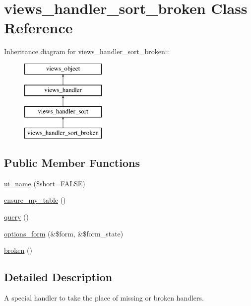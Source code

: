 \hypertarget{classviews__handler__sort__broken}{
\section{views\_\-handler\_\-sort\_\-broken Class Reference}
\label{classviews__handler__sort__broken}
}
Inheritance diagram for views\_\-handler\_\-sort\_\-broken::\begin{figure}[H]
\begin{center}
\leavevmode
\includegraphics[height=4cm]{classviews__handler__sort__broken}
\end{center}
\end{figure}
\subsection*{Public Member Functions}
\begin{CompactItemize}
\item 
\hyperlink{classviews__handler__sort__broken_d83cfcffa971a65b6e306d6fac7f6c10}{ui\_\-name} (\$short=FALSE)
\item 
\hyperlink{classviews__handler__sort__broken_148e3b71f7327ed44a139ecefbd1d43b}{ensure\_\-my\_\-table} ()
\item 
\hyperlink{classviews__handler__sort__broken_6298719637ac590b81496b4487b573ea}{query} ()
\item 
\hyperlink{classviews__handler__sort__broken_57d7f6176962083d4c17cbf448cb792f}{options\_\-form} (\&\$form, \&\$form\_\-state)
\item 
\hyperlink{classviews__handler__sort__broken_082f810e9181d6b2f878013897e3cc17}{broken} ()
\end{CompactItemize}


\subsection{Detailed Description}
A special handler to take the place of missing or broken handlers. 

